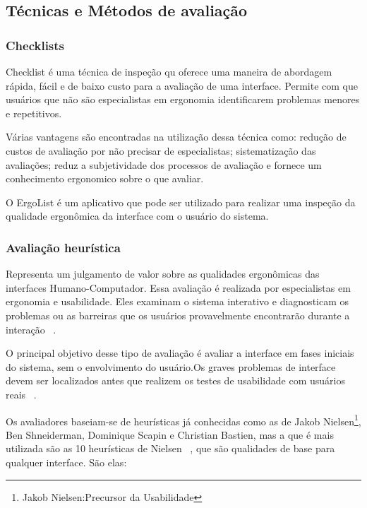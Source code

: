 \subsection{Técnicas e Métodos de avaliação}


\subsubsection{Checklists}

	Checklist é uma técnica de inspeção qu oferece uma maneira de abordagem rápida, fácil e de baixo custo para a avaliação de uma interface. Permite com que usuários que não são especialistas em ergonomia identificarem problemas menores e repetitivos.

	Várias vantagens são encontradas na utilização dessa técnica como: redução de custos de avaliação por não precisar de especialistas; sistematização das avaliações; reduz a subjetividade dos processos de avaliação e fornece um conhecimento ergonomico sobre o que avaliar.

	O ErgoList é um aplicativo que pode ser utilizado para realizar uma inspeção da qualidade ergonômica da interface com o usuário do sistema.

\subsubsection{Avaliação heurística}

	Representa um julgamento de valor sobre as qualidades ergonômicas das interfaces Humano-Computador. Essa avaliação é realizada por especialistas em ergonomia e usabilidade. Eles examinam o sistema interativo e diagnosticam os problemas ou as barreiras que os usuários provavelmente encontrarão durante a interação ~\cite{cybis2010}.

	O principal objetivo desse tipo de avaliação é avaliar a interface em fases iniciais do sistema, sem o envolvimento do usuário.Os graves problemas de interface devem ser localizados antes que realizem os testes de usabilidade com usuários reais ~\cite{santos2012}.

	Os avaliadores baseiam-se de heurísticas já conhecidas como as de Jakob Nielsen\footnote{Jakob Nielsen:Precursor da Usabilidade }, Ben Shneiderman, Dominique Scapin e Christian Bastien, mas a que é mais utilizada são as 10 heurísticas de Nielsen ~, que são qualidades de base para qualquer interface. São elas:


